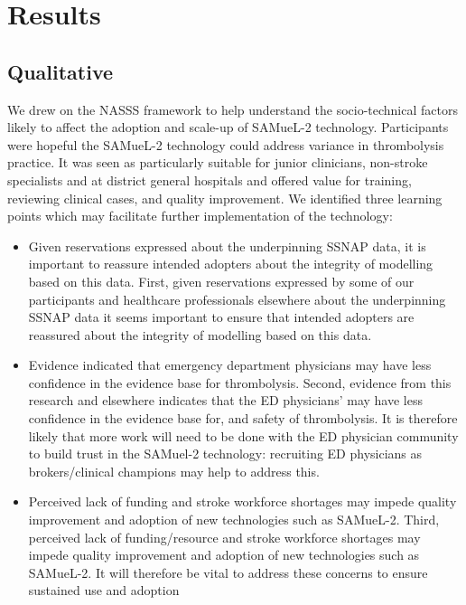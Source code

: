 \section{Results}

\subsection{Qualitative}

We drew on the NASSS framework to help understand the socio-technical factors likely to affect the adoption and scale-up of SAMueL-2 technology. Participants were hopeful the SAMueL-2 technology could address variance in thrombolysis practice. It was seen as particularly suitable for junior clinicians, non-stroke specialists and at district general hospitals and offered value for training, reviewing clinical cases, and quality improvement. We identified three learning  points  which  may  facilitate  further implementation of the technology:
\begin{itemize}

    \item Given reservations expressed about the underpinning SSNAP data, it is important to reassure intended adopters about the integrity of modelling based on this data.
    First, given reservations expressed by some of our participants and healthcare professionals elsewhere about the underpinning SSNAP data it seems important to ensure that intended adopters are reassured about the integrity of modelling based on this data.

    \item Evidence indicated that emergency department physicians may have less confidence in the evidence base for thrombolysis.
     Second, evidence from this research and elsewhere indicates that the ED physicians’ may have less confidence in the evidence base for, and safety of thrombolysis. It is therefore likely that more work will need to be done with the ED physician community to build trust in the SAMuel-2 technology: recruiting ED physicians as brokers/clinical champions may help to address this. 
    
    \item Perceived lack of funding and stroke workforce shortages may impede quality improvement and adoption of new technologies such as SAMueL-2.
    Third, perceived lack of funding/resource and stroke workforce shortages may impede quality improvement and adoption of new technologies such as SAMueL-2. It will therefore be vital to address these concerns to ensure sustained use and adoption

\end{itemize}

